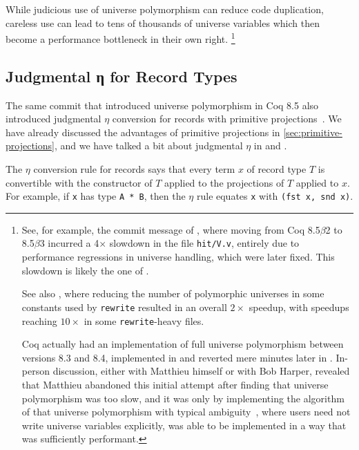While judicious use of universe polymorphism can reduce code duplication, careless use can lead to tens of thousands of universe variables which then become a performance bottleneck in their own right.%
\footnote{%
  See, for example, the commit message of , where moving from Coq 8.5$\beta$2 to 8.5$\beta$3 incurred a 4$\times$ slowdown in the file \texttt{hit/V.v}, entirely due to performance regressions in universe handling, which were later fixed.
  This slowdown is likely the one of .

  See also , where reducing the number of polymorphic universes in some constants used by \texttt{rewrite} resulted in an overall $2\times$ speedup, with speedups reaching $10\times$ in some \texttt{rewrite}-heavy files.

  Coq actually had an implementation of full universe polymorphism between versions 8.3 and 8.4, implemented in  and reverted mere minutes later in .
  In-person discussion, either with Matthieu himself or with Bob Harper, revealed that Matthieu abandoned this initial attempt after finding that universe polymorphism was too slow, and it was only by implementing the algorithm of \textcite{Harper1991107} that universe polymorphism with typical ambiguity~\cite{Universe2012Shulman,Typical1966Specker,Harper1991107}, where users need not write universe variables explicitly, was able to be implemented in a way that was sufficiently performant.%
}

\subsection{Judgmental η for Record Types}\label{sec:fixes:theory:record-eta}\label{sec:record-eta}
The same commit that introduced universe polymorphism in Coq 8.5 also introduced judgmental $\eta$ conversion for records with primitive projections~\cite{coq-commit-polyproj}.
We have already discussed the advantages of primitive projections in \autoref{sec:primitive-projections}, and we have talked a bit about judgmental $\eta$ in  and .

The $\eta$ conversion rule for records says that every term $x$ of record type $T$ is convertible with the constructor of $T$ applied to the projections of $T$ applied to $x$.
For example, if \texttt{x} has type \texttt{A * B}, then the $\eta$ rule equates \texttt{x} with \texttt{(fst x, snd x)}.

